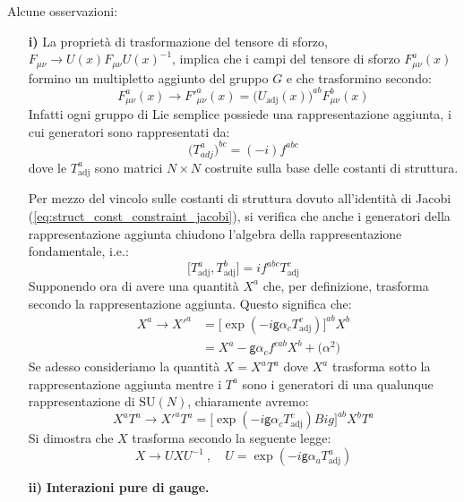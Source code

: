 \documentclass[../main.tex]{subfiles}
\begin{document}
\begin{nota}
    Alcune osservazioni:
    \begin{enumerate}
        \item[\textbf{i)}] La proprietà di trasformazione del tensore di sforzo, $F_{\mu\nu}\rightarrow U(x)F_{\mu\nu}U(x)^{-1}$, implica che i campi del tensore di sforzo $F_{\mu\nu}^a(x)$ formino un multipletto aggiunto del gruppo $G$ e che trasformino secondo:
        \[
        F_{\mu\nu}^a(x)\rightarrow {F'}_{\mu\nu}^{a}(x) = \big(U_\text{adj}(x)\big)^{ab}F_{\mu\nu}^b(x)
        \]
        Infatti ogni gruppo di Lie semplice possiede una rappresentazione aggiunta, i cui generatori sono rappresentati da:
        \[
        \big(T_{adj}^a\big)^{bc} = (-i)f^{abc}
        \]
        dove le $T_\text{adj}^a$ sono matrici $N\times N$ costruite sulla base delle costanti di struttura.

        Per mezzo del vincolo sulle costanti di struttura dovuto all'identità di Jacobi (\ref{eq:struct_const_constraint_jacobi}), si verifica che anche i generatori della rappresentazione aggiunta chiudono l'algebra della rappresentazione fondamentale, i.e.:
        \[
        \big[T_\text{adj}^a,T_\text{adj}^b\big] = i f^{abc}T_\text{adj}^c
        \]
        Supponendo ora di avere una quantità $X^a$ che, per definizione, trasforma secondo la rappresentazione aggiunta. Questo significa che:
        \begin{align*}
            X^a\rightarrow {X'}^a &= \Big[\exp(-i\mathsf{g}\alpha_cT^c_\text{adj})\Big]^{ab}X^b\\
            &=X^a - \mathsf{g}\alpha_c f^{cab}X^b + \mathscr(\alpha^2)
        \end{align*}
        Se adesso consideriamo la quantità $X=X^aT^a$ dove $X^a$ trasforma sotto la rappresentazione aggiunta mentre i $T^a$ sono i generatori di una qualunque rappresentazione di $\textrm{SU}(N)$, chiaramente avremo:
        \[
        X^aT^a \rightarrow {X'}^aT^a = \Big[\exp(-i\mathsf{g}\alpha_cT^c_\text{adj})Big]^{ab}X^bT^a
        \]
        Si dimostra che $X$ trasforma secondo la seguente legge:
        \[
        X \rightarrow UXU^{-1}~,\quad U=\exp(-i\mathsf{g}\alpha_aT^a_\text{adj})
        \]
        \item[\textbf{ii)}] \textbf{Interazioni pure di gauge.}


\end{enumerate}
\end{nota}
\end{document}
